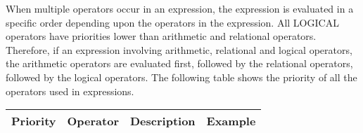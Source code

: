         When multiple operators occur in an expression, the expression is evaluated in a specific order depending upon the operators in the expression.
        All LOGICAL operators have priorities lower than arithmetic and relational operators. Therefore, if an expression involving arithmetic, relational
        and logical operators, the arithmetic operators are evaluated first, followed by the relational operators, followed by the logical operators.
        The following table shows the priority of all the operators used in expressions.
                \begin{table}[h!]
                        \mysmallfont{}
                        \centering{}
                        \begin{tabular}{|l|l|l|l|}
                                \hline
                        Priority       &          Operator      & Description                   & Example               \\\hline


\end{tabular}
\end{table}
